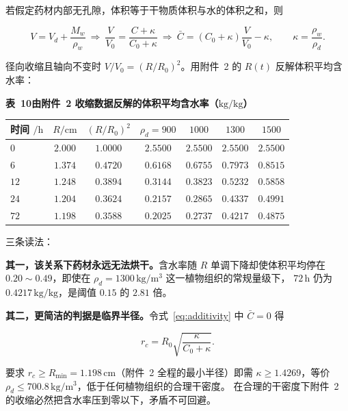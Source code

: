 \documentclass[withoutpreface,bwprint]{cumcmthesis} %
\begin{document}
\begin{appendices}
若假定药材内部无孔隙，体积等于干物质体积与水的体积之和，则

\begin{equation}
\label{eq:additivity}
V=V_d+\frac{M_w}{\rho_w}
\ \Longrightarrow\
\frac{V}{V_0}=\frac{C+\kappa}{C_0+\kappa}
\ \Longrightarrow\
\bar C=(C_0+\kappa)\frac{V}{V_0}-\kappa,
\qquad \kappa=\frac{\rho_w}{\rho_d}.
\end{equation}

径向收缩且轴向不变时 $V/V_0=(R/R_0)^2$。用附件~2 的 $R(t)$ 反解体积平均含水率：

\begin{table}[htbp]
\centering
\begin{minipage}{0.94\textwidth}
\centering\small
\textbf{表~10\quad 由附件~2 收缩数据反解的体积平均含水率（$\mathrm{kg/kg}$）}\\[3pt]
\begin{tabular}{lcccccc}
\toprule
时间 $/\mathrm{h}$ & $R/\mathrm{cm}$ & $(R/R_0)^2$
 & $\rho_d=900$ & $1000$ & $1300$ & $1500$ \\
\midrule
$0$    & $2.000$ & $1.0000$ & $2.5500$ & $2.5500$ & $2.5500$ & $2.5500$ \\
$6$    & $1.374$ & $0.4720$ & $0.6168$ & $0.6755$ & $0.7973$ & $0.8515$ \\
$12$   & $1.248$ & $0.3894$ & $0.3144$ & $0.3823$ & $0.5232$ & $0.5858$ \\
$24$   & $1.204$ & $0.3624$ & $0.2157$ & $0.2865$ & $0.4337$ & $0.4991$ \\
$72$   & $1.198$ & $0.3588$ & $0.2025$ & $0.2737$ & $0.4217$ & $0.4875$ \\
\bottomrule
\end{tabular}
\end{minipage}
\end{table}

\noindent 三条读法：

\textbf{其一，该关系下药材永远无法烘干。}含水率随 $R$ 单调下降却使体积平均停在
$0.20\sim0.49$，即使在 $\rho_d=1300\,\mathrm{kg/m^3}$ 这一植物组织的常规量级下，
$72\,\mathrm{h}$ 仍为 $0.4217\,\mathrm{kg/kg}$，是阈值 $0.15$ 的 $2.81$ 倍。

\textbf{其二，更简洁的判据是临界半径。}令式~\eqref{eq:additivity} 中 $\bar C=0$ 得

\begin{equation}
r_c=R_0\sqrt{\frac{\kappa}{C_0+\kappa}}.
\end{equation}

要求 $r_c\ge R_{\min}=1.198\,\mathrm{cm}$（附件~2 全程的最小半径）即需
$\kappa\ge1.4269$，等价 $\rho_d\le700.8\,\mathrm{kg/m^3}$，低于任何植物组织的合理干密度。
在合理的干密度下附件~2 的收缩必然把含水率压到零以下，矛盾不可回避。


\end{appendices}
\end{document}
